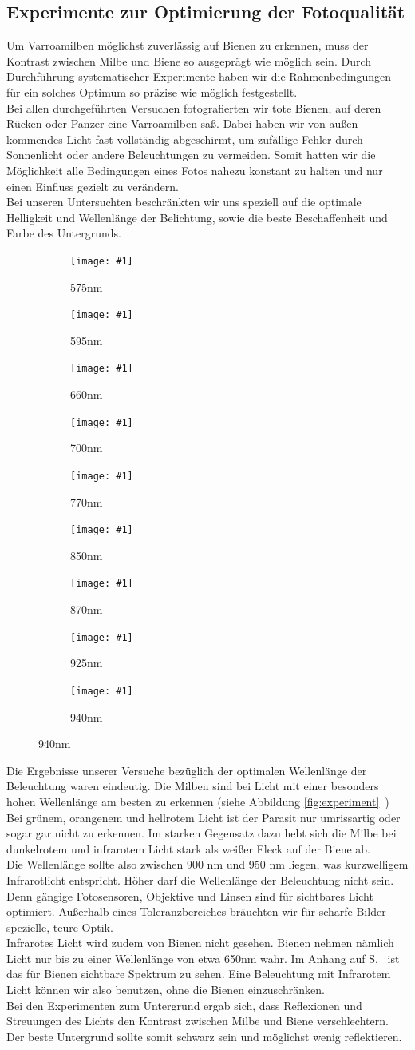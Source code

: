 \documentclass[11pt,a4paper]{article}
\newcommand{\subpicture}[2]{
    \begin{subfigure}{.3\textwidth}
        \centering
        \texttt{[image: \#1]}
        \caption{#2}
    \end{subfigure}
}
\begin{document}
\subsection{Experimente zur Optimierung der Fotoqualität}
Um Varroamilben möglichst zuverlässig auf Bienen zu erkennen, muss der Kontrast zwischen Milbe und Biene so ausgeprägt wie möglich sein. Durch Durchführung systematischer Experimente haben wir die Rahmenbedingungen für ein solches Optimum so präzise wie möglich festgestellt.\\
Bei allen durchgeführten Versuchen fotografierten wir tote Bienen, auf deren Rücken oder Panzer eine Varroamilben saß. Dabei haben wir von außen kommendes Licht fast vollständig abgeschirmt, um zufällige Fehler durch Sonnenlicht oder andere Beleuchtungen zu vermeiden. Somit hatten wir die Möglichkeit alle Bedingungen eines Fotos nahezu konstant zu halten und nur einen Einfluss gezielt zu verändern.\\
Bei unseren Untersuchten beschränkten wir uns speziell auf die optimale Helligkeit und Wellenlänge der Belichtung, sowie die beste Beschaffenheit und Farbe des Untergrunds.\\
\begin{figure}[H] \label{fig:experiment}
	\centering
        \subpicture{images/575nm.jpg}{575nm}
        \subpicture{images/595nm.jpg}{595nm}
        \subpicture{images/660nm.jpg}{660nm}
        \subpicture{images/700nm.jpg}{700nm}
        \subpicture{images/770nm.jpg}{770nm}
        \subpicture{images/850nm.jpg}{850nm}
        \subpicture{images/870nm.jpg}{870nm}
        \subpicture{images/925nm.jpg}{925nm}
        \subpicture{images/940nm.jpg}{940nm}
\end{figure}
\noindent
Die Ergebnisse unserer Versuche bezüglich der optimalen Wellenlänge der Beleuchtung waren eindeutig. Die Milben sind bei Licht mit einer besonders hohen Wellenlänge am besten zu erkennen (siehe Abbildung \ref*{fig:experiment} \,) Bei grünem, orangenem und hellrotem Licht ist der Parasit nur umrissartig oder sogar gar nicht zu erkennen. Im starken Gegensatz dazu hebt sich die Milbe bei dunkelrotem und infrarotem Licht stark als weißer Fleck auf der Biene ab.\\
Die Wellenlänge sollte also zwischen 900 nm und 950 nm liegen, was kurzwelligem Infrarotlicht entspricht. Höher darf die Wellenlänge der Beleuchtung nicht sein. Denn gängige Fotosensoren, Objektive und Linsen sind für sichtbares Licht optimiert. Außerhalb eines Toleranzbereiches bräuchten wir für scharfe Bilder spezielle, teure Optik.\\
Infrarotes Licht wird zudem von Bienen nicht gesehen. Bienen nehmen nämlich Licht nur bis zu einer Wellenlänge von etwa 650nm wahr. Im Anhang auf S. \pageref*{fig:bee-vision} \, ist das für Bienen sichtbare Spektrum zu sehen. Eine Beleuchtung mit Infrarotem Licht können wir also benutzen, ohne die Bienen einzuschränken.\\
Bei den Experimenten zum Untergrund ergab sich, dass Reflexionen und Streuungen des Lichts den Kontrast zwischen Milbe und Biene verschlechtern. Der beste Untergrund sollte somit schwarz sein und möglichst wenig reflektieren.
\end{document}
